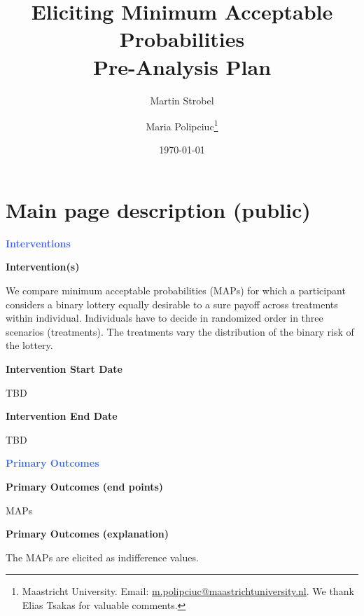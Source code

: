 \usepackage{preliminary}

\title{Eliciting Minimum Acceptable Probabilities \\
\Large Pre-Analysis Plan}
\author{Martin Strobel  \and Maria Polipciuc\thanks{Maastricht University. Email: \url{m.polipciuc@maastrichtuniversity.nl}. We thank Elias Tsakas for valuable comments.}}
\date{\today	\vspace{1cm}}
\titlepage



\begin{titlepage}
\clearpage\maketitle
\thispagestyle{empty}

\end{titlepage}
\section{Main page description (public)}

\large \textcolor{RoyalBlue}{\textbf{Interventions}}

\normalsize \noindent \textcolor{NavyBlue}{\textbf{Intervention(s)}}

We compare minimum acceptable probabilities (MAPs) for which a participant considers a binary lottery equally desirable to a sure payoff across treatments within individual.
Individuals have to decide in randomized order in three scenarios (treatments).
The treatments vary the distribution of the binary risk of the lottery.


\noindent \textcolor{NavyBlue}{\textbf{Intervention Start Date}}

TBD

\noindent \textcolor{NavyBlue}{\textbf{Intervention End Date}}

TBD



\large \noindent \textcolor{RoyalBlue}{\textbf{Primary Outcomes}}

\normalsize \noindent \textcolor{NavyBlue}{\textbf{Primary Outcomes (end points)}}

MAPs

\noindent \textcolor{NavyBlue}{\textbf{Primary Outcomes (explanation)}}

The MAPs are elicited as indifference values. 



